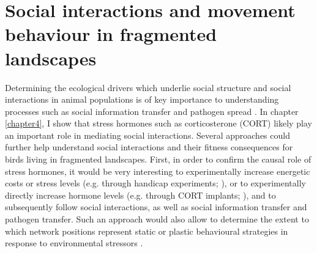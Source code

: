 \documentclass[10pt, twoside]{book} %
\begin{document}
	\section{Social interactions and movement behaviour in fragmented landscapes}
	
Determining the ecological drivers which underlie social structure and social interactions in animal populations is of key importance to understanding processes such as social information transfer and pathogen spread \citep{Farine2015, Croft2016}. In chapter \ref{chapter4}, I show that stress hormones such as corticosterone (CORT) likely play an important role in mediating social interactions. Several approaches could further help understand social interactions and their fitness consequences for birds living in fragmented landscapes. First, in order to confirm the causal role of stress hormones, it would be very interesting to experimentally increase energetic costs or stress levels (e.g. through handicap experiments; \citealt{Johns2018}), or to experimentally directly increase hormone levels (e.g. through CORT implants; \citealt{Lattin2011}), and to subsequently follow social interactions, as well as social information transfer and pathogen transfer. Such an approach would also allow to determine the extent to which network positions represent static or plastic behavioural strategies in response to environmental stressors \citep{StClair2015, Aplin2015a}.\\
 
\end{document}
